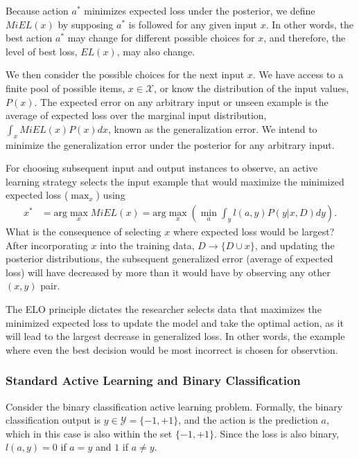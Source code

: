 \documentclass[nonblindrev]{informs3}
\begin{document}
Because action $a^{*}$ minimizes expected loss under the posterior, we define $MiEL(x)$ by supposing $a^{*}$ is followed for any given input $x$. In other words, the best action $a^{*}$ may change for different possible choices for $x$, and therefore, the level of best loss, $EL(x)$, may also change. 

We then consider the possible choices for the next input $x$. We have access to a finite pool of possible items, $x \in \mathcal{X}$, or know the distribution of the input values, $P(x)$. The expected error on any arbitrary input or unseen example is the average of expected loss over the marginal input distribution, $\int_x MiEL(x)P(x)dx$, known as the generalization error. We intend to minimize the generalization error under the posterior for any arbitrary input.

For choosing subsequent input and output instances to observe, an active learning strategy selects the input example that would maximize the minimized expected loss ($\max_x$) using 
\begin{align}
x^{*}  &= \text{arg}\max_x MiEL(x) = \text{arg}\max_{x} \left( \min_{a} \int_y l(a,y) P(y|x,D) dy \right).
\end{align}
What is the consequence of selecting $x$ where expected loss would be largest? After incorporating $x$ into the training data, $D \to \{D \cup x \}$, and updating the posterior distributions, the subsequent generalized error (average of expected loss) will have decreased by more than it would have by observing any other $(x,y)$ pair.

The ELO principle dictates the researcher selects data that maximizes the minimized expected loss  to update the model and take the optimal action, as it will lead to the largest decrease in generalized loss. In other words, the example where even the best decision would be most incorrect is chosen for observtion. 

\subsubsection{Standard Active Learning and Binary Classification}

Consider the binary classification active learning problem. Formally, the binary classification output is $y \in \mathcal{Y} = \{-1,+1\}$, and the action is the prediction $a$, which in this case is also within the set $\{-1,+1\}$. Since the loss is also binary, $l(a,y)=0$ if $a=y$ and $1$ if $a \neq y$. 
\end{document}
